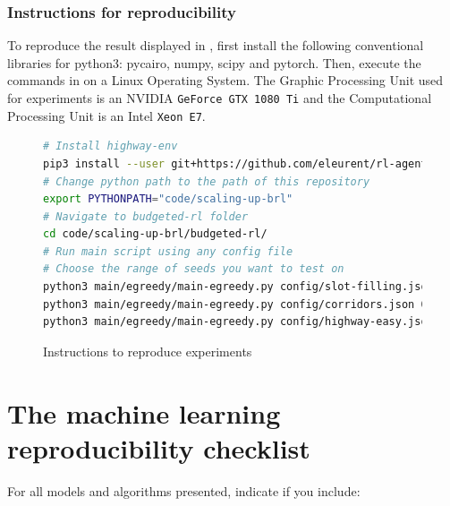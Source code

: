 \subsubsection{Instructions for reproducibility}
\label{subsubsec:instruction-reproducibility}
To reproduce the result displayed in , first install the following conventional libraries for python3: pycairo, numpy, scipy and pytorch. Then, execute the commands in  on a Linux Operating System. The Graphic Processing Unit used for experiments is an NVIDIA \texttt{GeForce GTX 1080 Ti} and the Computational Processing Unit is an Intel \texttt{Xeon E7}.

\begin{figure}
    \centering
    

\begin{lstlisting}[language=bash,caption={bash version}]
# Install highway-env
pip3 install --user git+https://github.com/eleurent/rl-agents
# Change python path to the path of this repository
export PYTHONPATH="code/scaling-up-brl"
# Navigate to budgeted-rl folder
cd code/scaling-up-brl/budgeted-rl/
# Run main script using any config file
# Choose the range of seeds you want to test on
python3 main/egreedy/main-egreedy.py config/slot-filling.json 0 6
python3 main/egreedy/main-egreedy.py config/corridors.json 0 4
python3 main/egreedy/main-egreedy.py config/highway-easy.json 0 10
\end{lstlisting}

\caption{Instructions to reproduce experiments}
    \label{fig:instructions}
\end{figure}


\section{The machine learning reproducibility checklist}
\label{sec:ml-checklist}
For all models and algorithms presented, indicate if you include: 

